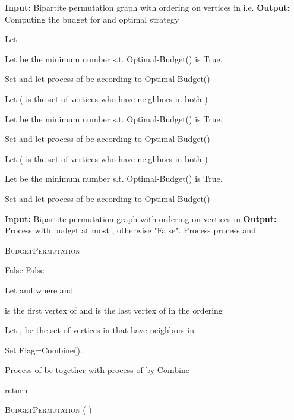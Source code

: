 \documentclass[letterpaper,11pt,abstracton]{scrartcl}
\begin{document}
\begin{algorithm}[H]
\begin{algorithmic}[1]

\State \textbf{Input:} Bipartite permutation graph  with ordering  on vertices in 
i.e. \;
\State \textbf{Output:} Computing the budget for  and optimal strategy\;



 \State Let  
 
 \State Let  be the minimum number s.t. Optimal-Budget() is True. 
 
 \State Set  and let process of  be according to Optimal-Budget() 
 


   \State Let  ( is the set of vertices who have neighbors in both )   

    \State Let  be the minimum number s.t. Optimal-Budget() is True. 
    
    \State Set  and let process of  be according to Optimal-Budget()
    


 


   \State Let  ( is the set of vertices who have neighbors in both )

    \State Let  be the minimum number s.t. Optimal-Budget() is True. 
    
    \State Set  and let process of  be according to Optimal-Budget()
    


\EndFor

\EndFor 

\Statex 
{} 
\State \textbf{Input:} Bipartite permutation graph  with ordering  on vertices in 
\State \textbf{Output:} Process  with budget at most , otherwise "False".\;
\Return Process \;
\EndIf
{}
     process  and 
     
     \State \Return \textsc{BudgetPermutation} \;
\EndIf

\Return False\;
\EndIf
{}
\Return False\;
\EndIf

\State Let  and  where  and 

 \hspace{2mm}  is the first vertex of  and  is the last vertex of  in the ordering 

\State Let ,   be the set of vertices in  that have neighbors in 
\Comment{}\;

\State Set Flag=Combine().


 \State Process of  be  together with process of  by Combine

 \State return

 \EndIf
\EndFor

 \EndFunction



\end{algorithmic}
\caption{{\textsc{BudgetPermutation}} ( )}
\label{alg:permutation}
\end{algorithm}
\end{document}
